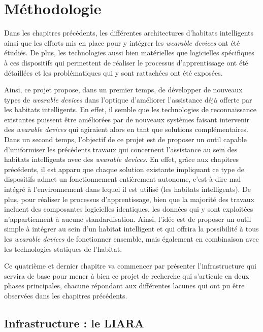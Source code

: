 \chapter{Méthodologie}
\label{chap:4}

Dans les chapitres précédents, les différentes architectures d'habitats intelligents ainsi que les efforts mis en place pour y intégrer les \textit{wearable devices} ont été étudiés. De plus, les technologies aussi bien matérielles que logicielles spécifiques à ces dispositifs qui permettent de réaliser le processus d'apprentissage ont été détaillées et les problématiques qui y sont rattachées ont été exposées. 

Ainsi, ce projet propose, dans un premier temps, de développer de nouveaux types de \textit{wearable devices} dans l'optique d'améliorer l'assistance déjà offerte par les habitats intelligents. En effet, il semble que les technologies de reconnaissance existantes puissent être améliorées par de nouveaux systèmes faisant intervenir des \textit{wearable devices} qui agiraient alors en tant que solutions complémentaires. Dans un second temps, l'objectif de ce projet est de proposer un outil capable d'uniformiser les précédents travaux qui concernent l'assistance au sein des habitats intelligents avec des \textit{wearable devices}. En effet, grâce aux chapitres précédents, il est apparu que chaque solution existante impliquant ce type de dispositifs admet un fonctionnement entièrement autonome, c'est-à-dire mal intégré à l'environnement dans lequel il est utilisé (les habitats intelligents). De plus, pour réaliser le processus d'apprentissage, bien que la majorité des travaux incluent des composantes logicielles identiques, les données qui y sont exploitées n'appartiennent à aucune standardisation. Ainsi, l'idée est de proposer un outil simple à intégrer au sein d'un habitat intelligent et qui offrira la possibilité à tous les \textit{wearable devices} de fonctionner ensemble, mais également en combinaison avec les technologies \og statiques \fg de l'habitat.  

Ce quatrième et dernier chapitre va commencer par présenter l'infrastructure qui servira de base pour mener à bien ce projet de recherche qui s'articule en deux phases principales, chacune répondant aux différentes lacunes qui ont pu être observées dans les chapitres précédents. 

\section{Infrastructure : le \acs{LIARA}}

